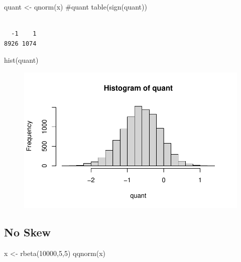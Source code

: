 \documentclass[
  letterpaper,
  DIV=11,
  numbers=noendperiod]{scrreprt}
\newenvironment{Shaded}{\begin{snugshade}}{\end{snugshade}}
\newcommand{\CommentTok}[1]{\textcolor[rgb]{0.37,0.37,0.37}{#1}}
\newcommand{\DecValTok}[1]{\textcolor[rgb]{0.68,0.00,0.00}{#1}}
\newcommand{\FunctionTok}[1]{\textcolor[rgb]{0.28,0.35,0.67}{#1}}
\newcommand{\NormalTok}[1]{\textcolor[rgb]{0.00,0.23,0.31}{#1}}
\newcommand{\OtherTok}[1]{\textcolor[rgb]{0.00,0.23,0.31}{#1}}
\begin{document}
\begin{Shaded}
\begin{Highlighting}[]
\NormalTok{quant }\OtherTok{\textless{}{-}} \FunctionTok{qnorm}\NormalTok{(x)}
\CommentTok{\#quant}
\FunctionTok{table}\NormalTok{(}\FunctionTok{sign}\NormalTok{(quant))}
\end{Highlighting}
\end{Shaded}

\begin{verbatim}

  -1    1 
8926 1074 
\end{verbatim}

\begin{Shaded}
\begin{Highlighting}[]
\FunctionTok{hist}\NormalTok{(quant)}
\end{Highlighting}
\end{Shaded}

\begin{figure}[H]

{\centering \includegraphics{methods_files/figure-pdf/unnamed-chunk-3-3.pdf}

}

\end{figure}

\hypertarget{no-skew}{%
\subsection{No Skew}\label{no-skew}}

\begin{Shaded}
\begin{Highlighting}[]
\NormalTok{x }\OtherTok{\textless{}{-}} \FunctionTok{rbeta}\NormalTok{(}\DecValTok{10000}\NormalTok{,}\DecValTok{5}\NormalTok{,}\DecValTok{5}\NormalTok{)}
\FunctionTok{qqnorm}\NormalTok{(x)}
\end{Highlighting}
\end{Shaded}
\end{document}
